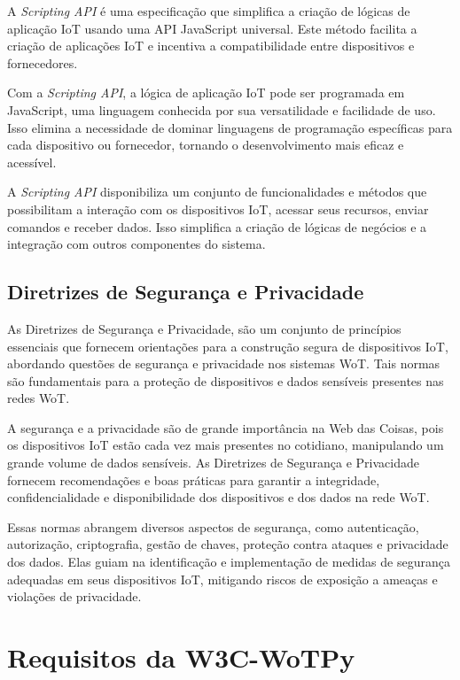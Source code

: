 A \textit{Scripting API} é uma especificação que simplifica a criação de lógicas de aplicação IoT usando uma API JavaScript universal. Este método facilita a criação de aplicações IoT e incentiva a compatibilidade entre dispositivos e fornecedores.

Com a \textit{Scripting API}, a lógica de aplicação IoT pode ser programada em JavaScript, uma linguagem conhecida por sua versatilidade e facilidade de uso. Isso elimina a necessidade de dominar linguagens de programação específicas para cada dispositivo ou fornecedor, tornando o desenvolvimento mais eficaz e acessível.

A \textit{Scripting API} disponibiliza um conjunto de funcionalidades e métodos que possibilitam a interação com os dispositivos IoT, acessar seus recursos, enviar comandos e receber dados. Isso simplifica a criação de lógicas de negócios e a integração com outros componentes do sistema.

\subsection{Diretrizes de Segurança e Privacidade}

As Diretrizes de Segurança e Privacidade, são um conjunto de princípios essenciais que fornecem orientações para a construção segura de dispositivos IoT, abordando questões de segurança e privacidade nos sistemas WoT. Tais normas são fundamentais para a proteção de dispositivos e dados sensíveis presentes nas redes WoT.

A segurança e a privacidade são de grande importância na Web das Coisas, pois os dispositivos IoT estão cada vez mais presentes no cotidiano, manipulando um grande volume de dados sensíveis. As Diretrizes de Segurança e Privacidade fornecem recomendações e boas práticas para garantir a integridade, confidencialidade e disponibilidade dos dispositivos e dos dados na rede WoT.

Essas normas abrangem diversos aspectos de segurança, como autenticação, autorização, criptografia, gestão de chaves, proteção contra ataques e privacidade dos dados. Elas guiam na identificação e implementação de medidas de segurança adequadas em seus dispositivos IoT, mitigando riscos de exposição a ameaças e violações de privacidade.

\section{Requisitos da W3C-WoTPy}

